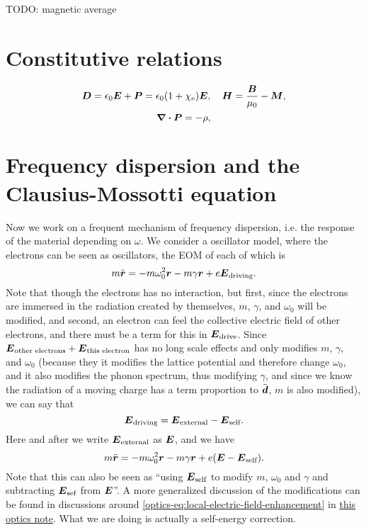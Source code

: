 \documentclass[hyperref, a4paper]{article}
\newcommand{\opticsdoc}{\href{../optics/optics.pdf}{this optics note}}
\begin{document}
TODO: magnetic average

\section{Constitutive relations}

\begin{equation}
    \vb*{D} = \epsilon_0 \vb*{E} + \vb*{P} = \epsilon_0 (1 + \chi_\text{e}) \vb*{E}, \quad 
    \vb*{H} = \frac{\vb*{B}}{\mu_0} - \vb*{M},
\end{equation}
\begin{equation}
    \div{\vb*{P}} = - \rho,
\end{equation}


\section{Frequency dispersion and the Clausius-Mossotti equation}

Now we work on a frequent mechanism of frequency dispersion, i.e. the response of the material depending on 
$\omega$. We consider a oscillator model, where the electrons can be seen as oscillators, 
the EOM of each of which is
\begin{equation}
    m \ddot{\vb*{r}} = - m \omega_0^2 \vb*{r} - m \gamma \vb*{r} + e \vb*{E}_\text{driving}.
\end{equation}
Note that though the electrons has no interaction, but first, since the electrons are immersed in the 
radiation created by themselves, $m$, $\gamma$, and $\omega_0$ will be modified, and second, an electron 
can feel the collective electric field of other electrons, and there must be a term for this in 
$\vb*{E}_\text{drive}$. Since $\vb*{E}_\text{other electrons} + \vb*{E}_\text{this electron}$ has no
long scale effects and only modifies $m$, $\gamma$, and $\omega_0$ (because they it modifies the lattice potential
and therefore change $\omega_0$, and it also modifies the phonon spectrum, thus modifying $\gamma$, and 
since we know the radiation of a moving charge has a term proportion to $\ddot{\vb*{d}}$, $m$ is also modified),
we can say that 
\[
    \vb*{E}_\text{driving} = \vb*{E}_\text{external} - \vb*{E}_\text{self}.
\]
Here and after we write $\vb*{E}_\text{external}$ as $\vb*{E}$, and we have 
\begin{equation}
    m \ddot{\vb*{r}} = - m \omega_0^2 \vb*{r} - m \gamma \vb*{r} + e (\vb*{E} - \vb*{E}_\text{self}).
\end{equation}
Note that this can also be seen as ``using $\vb*{E}_\text{self}$ to modify $m$, $\omega_0$ and $\gamma$ and
subtracting $\vb*{E}_\text{sef}$ from $\vb*{E}$''. A more generalized discussion of the modifications 
can be found in discussions around \eqref{optics-eq:local-electric-field-enhancement} in \opticsdoc.
What we are doing is actually a self-energy correction.
\end{document}
